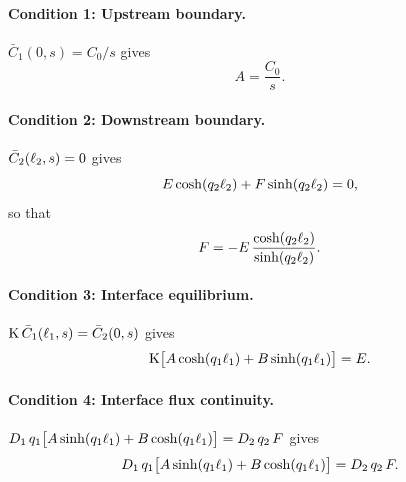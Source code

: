 \paragraph{Condition 1: Upstream boundary.}
$\bar{C}_1(0,s) = C_0/s$ gives
\begin{equation}
  \label{eq:cond1}
  A = \frac{C_0}{s}.
\end{equation}

\paragraph{Condition 2: Downstream boundary.}
$\bar{C}_2(\ell_{2},s) = 0$ gives
\begin{equation}
  \label{eq:cond2}
  E\cosh(q_2\ell_{2}) + F\sinh(q_2\ell_{2}) = 0,
\end{equation}
so that
\begin{equation}
  \label{eq:F-from-E}
  F = -E\,\frac{\cosh(q_2\ell_{2})}{\sinh(q_2\ell_{2})}.
\end{equation}

\paragraph{Condition 3: Interface equilibrium.}
$\mathrm{K}\,\bar{C}_1(\ell_{1},s) = \bar{C}_2(0,s)$ gives
\begin{equation}
  \label{eq:cond3}
  \mathrm{K}\bigl[A\cosh(q_1\ell_{1}) + B\sinh(q_1\ell_{1})\bigr] = E.
\end{equation}

\paragraph{Condition 4: Interface flux continuity.}
$D_{1}\,q_1\bigl[A\sinh(q_1\ell_{1}) + B\cosh(q_1\ell_{1})\bigr]
= D_{2}\,q_2\,F$ gives
\begin{equation}
  \label{eq:cond4}
  D_{1}\,q_1\bigl[A\sinh(q_1\ell_{1}) + B\cosh(q_1\ell_{1})\bigr]
  = D_{2}\,q_2\,F.
\end{equation}

